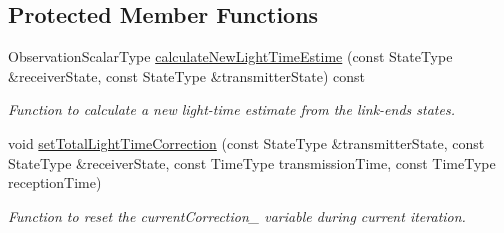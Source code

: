 \subsection*{Protected Member Functions}
\begin{DoxyCompactItemize}
\item 
Observation\+Scalar\+Type \hyperlink{classtudat_1_1observation__models_1_1LightTimeCalculator_a209aabee665a259cd66d3da7561a0029}{calculate\+New\+Light\+Time\+Estime} (const State\+Type \&receiver\+State, const State\+Type \&transmitter\+State) const 
\begin{DoxyCompactList}\small\item\em Function to calculate a new light-\/time estimate from the link-\/ends states. \end{DoxyCompactList}\item 
void \hyperlink{classtudat_1_1observation__models_1_1LightTimeCalculator_a37931071dd66c8d99db80fd917fec67c}{set\+Total\+Light\+Time\+Correction} (const State\+Type \&transmitter\+State, const State\+Type \&receiver\+State, const Time\+Type transmission\+Time, const Time\+Type reception\+Time)
\begin{DoxyCompactList}\small\item\em Function to reset the current\+Correction\+\_\+ variable during current iteration. \end{DoxyCompactList}\end{DoxyCompactItemize}
